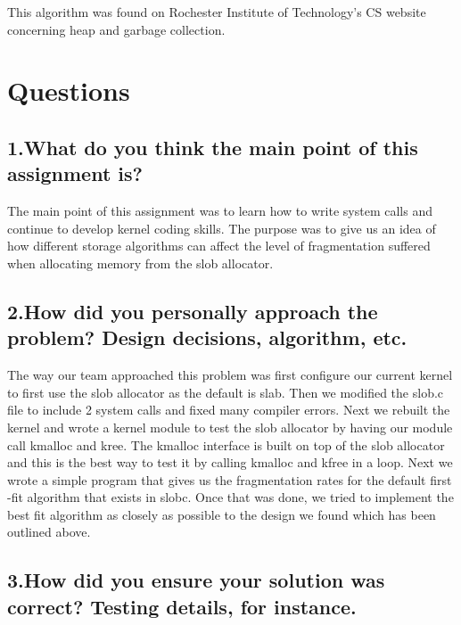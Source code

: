 \documentclass[onecolumn, draftclsnofoot,10pt, compsoc]{IEEEtran}
\begin{document}
This algorithm was found on Rochester Institute of Technology's CS website concerning heap and garbage collection. 


	\section*{Questions}
	\subsection*{1.What do you think the main point of this assignment is?}
	The main point of this assignment was to learn how to write system calls and continue to develop
	 kernel coding skills. The purpose was to give us an idea of how different storage algorithms can affect the level of fragmentation suffered when allocating memory from the slob allocator. 

	\subsection*{2.How did you personally approach the problem? Design decisions, algorithm, etc.}
	The way our team approached this problem was first configure our current kernel to first use the slob allocator as the default is slab. Then we modified the slob.c file to include 2 system calls and fixed many compiler errors. Next we rebuilt the kernel and wrote a kernel module to test the slob allocator by having our module call kmalloc and kree. The kmalloc interface is built on top of the slob allocator and this is the best way to test it by calling kmalloc and kfree in a loop. Next we wrote a simple program that gives us the fragmentation rates for the default first -fit algorithm that exists in slobc. 
		Once that was done, we tried to implement the best fit algorithm as closely as possible to the design we found which has been outlined above.

	\subsection*{3.How did you ensure your solution was correct? Testing details, for instance.}
\end{document}
